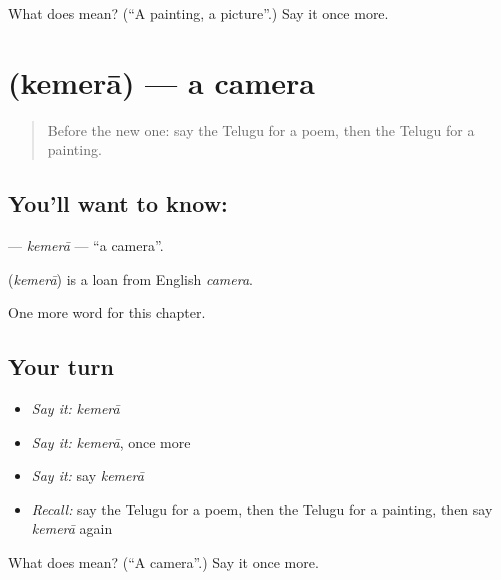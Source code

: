\begin{tcolorbox}[breakable,colback=teal!4,colframe=teal!35!black,title={Before you move on}]
What does  mean? (\textquotedblleft{}A painting, a picture\textquotedblright{}.) Say it once more.
\end{tcolorbox}
\section[\texorpdfstring{\te{కెమెరా} (kemerā)}{కెమెరా (kemerā)}]{ (kemerā) — a camera}

\label{lesson:TE-C230-kemera}



\begin{quote}
Before the new one: say the Telugu for a poem, then the Telugu for a painting.
\end{quote}

\subsection*{You'll want to know: }
\textbf{} — \emph{kemerā} — \textquotedblleft{}a camera\textquotedblright{}.

\begin{cousinweb}
\textbf{} (\emph{kemerā}) is a loan from English \emph{camera}.
\end{cousinweb}

\begin{grammarlens}[title={What you've built}]
One more word for this chapter.
\end{grammarlens}

\subsection*{Your turn}
\begin{itemize}
\raggedright
  \item \emph{Say it:} \emph{kemerā}
  \item \emph{Say it:} \emph{kemerā}, once more
  \item \emph{Say it:} say \emph{kemerā}
  \item \emph{Recall:} say the Telugu for a poem, then the Telugu for a painting, then say \emph{kemerā} again
\end{itemize}

\begin{tcolorbox}[breakable,colback=teal!4,colframe=teal!35!black,title={Before you move on}]
What does  mean? (\textquotedblleft{}A camera\textquotedblright{}.) Say it once more.
\end{tcolorbox}

